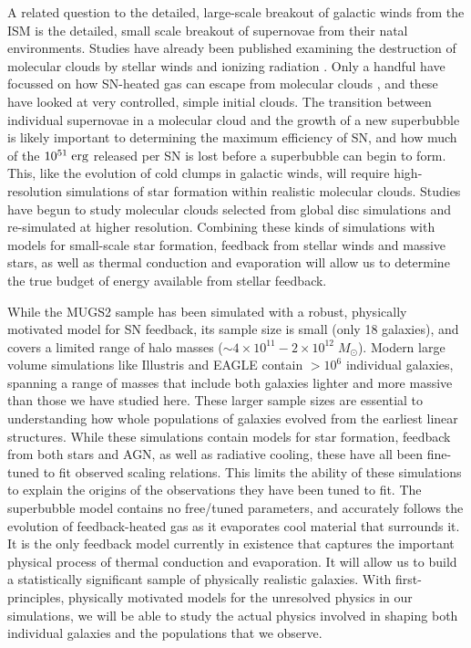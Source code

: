 A related question to the detailed, large-scale breakout of galactic winds from
the ISM is the detailed, small scale breakout of supernovae from their natal
environments.  Studies have already been published examining the destruction of
molecular clouds by stellar winds and ionizing radiation
\citep{Murray2010,Walch2012}.  Only a handful have focussed on how SN-heated gas
can escape from molecular clouds \citep{Rogers2013}, and these have looked at
very controlled, simple initial clouds.  The transition between individual
supernovae in a molecular cloud and the growth of a new superbubble is likely
important to determining the maximum efficiency of SN, and how much 
of the $10^{51}\;\rm{erg}$ released per SN is lost before a superbubble can begin
to form.  This, like the evolution of cold clumps in galactic winds, will
require high-resolution simulations of star formation within realistic molecular
clouds.  Studies have begun \citep{Dobbs2015} to study molecular clouds selected
from global disc simulations and re-simulated at higher resolution.  Combining
these kinds of simulations with models for small-scale star formation, feedback
from stellar winds and massive stars, as well as thermal conduction and
evaporation will allow us to determine the true budget of energy available from
stellar feedback.

While the MUGS2 sample has been simulated with a robust, physically motivated
model for SN feedback, its sample size is small (only 18 galaxies), and covers a
limited range of halo masses ($\sim 4\times10^{11}-2\times10^{12}\;M_\odot$).
Modern large volume simulations like Illustris \citep{Vogelsberger2014b} and
EAGLE \citep{Schaye2015} contain $>10^6$ individual galaxies, spanning a range
of masses that include both galaxies lighter and more massive than those we have
studied here.  These larger sample sizes are essential to understanding how
whole populations of galaxies evolved from the earliest linear structures.
While these simulations contain models for star formation, feedback from both
stars and AGN, as well as radiative cooling, these have all been fine-tuned to
fit observed scaling relations.  This limits the ability of these simulations to
explain the origins of the observations they have been tuned to fit.  The
superbubble model contains no free/tuned parameters, and accurately follows the
evolution of feedback-heated gas as it evaporates cool material that surrounds
it.  It is the only feedback model currently in existence that captures the
important physical process of thermal conduction and evaporation.  It will allow
us to build a statistically significant sample of physically realistic galaxies.
With first-principles, physically motivated models for the unresolved physics in
our simulations, we will be able to study the actual physics involved in shaping
both individual galaxies and the populations that we observe. 



